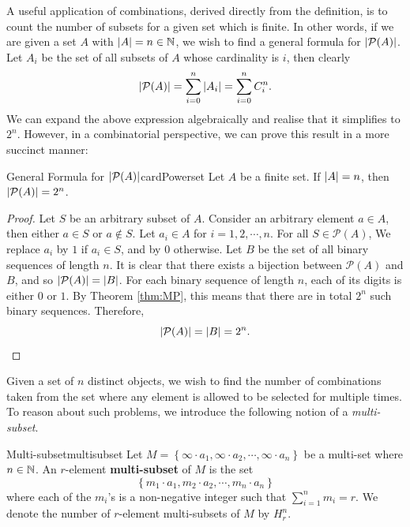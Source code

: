 \documentclass[math]{amznotes}
\theoremstyle{remark}
\begin{document}
A useful application of combinations, derived directly from the definition, is to count the number of subsets for a given set which is finite. In other words, if we are given a set $A$ with ${\left\lvert {A} \right\rvert} = n \in \mathbb{N}$, we wish to find a general formula for ${\left\lvert {\mathcal{P}(A)} \right\rvert}$. Let $A_i$ be the set of all subsets of $A$ whose cardinality is $i$, then clearly
\begin{equation*}
    {\left\lvert {\mathcal{P}(A)} \right\rvert} = \sum_{i = 0}^{n}{\left\lvert {A_i} \right\rvert} = \sum_{i = 0}^{n}C^n_i.
\end{equation*}
We can expand the above expression algebraically and realise that it simplifies to $2^n$. However, in a combinatorial perspective, we can prove this result in a more succinct manner:
\begin{thmbox}{General Formula for ${\left\lvert {\mathcal{P}(A)} \right\rvert}$}{cardPowerset}
    Let $A$ be a finite set. If ${\left\lvert {A} \right\rvert} = n$, then ${\left\lvert {\mathcal{P}(A)} \right\rvert} = 2^n$.
    \tcblower
    \begin{proof}
        Let $S$ be an arbitrary subset of $A$. Consider an arbitrary element $a \in A$, then either $a \in S$ or $a \notin S$. Let $a_i \in A$ for $i = 1, 2, \cdots, n$. For all $S \in \mathcal{P}(A)$, We replace $a_i$ by $1$ if $a_i \in S$, and by $0$ otherwise. Let $B$ be the set of all binary sequences of length $n$. It is clear that there exists a bijection between $\mathcal{P}(A)$ and $B$, and so ${\left\lvert {\mathcal{P}(A)} \right\rvert} = {\left\lvert {B} \right\rvert}$. For each binary sequence of length $n$, each of its digits is either $0$ or $1$. By Theorem \ref{thm:MP}, this means that there are in total $2^n$ such binary sequences. Therefore,
        \begin{equation*}
            {\left\lvert {\mathcal{P}(A)} \right\rvert} = {\left\lvert {B} \right\rvert} = 2^n.
        \end{equation*}
    \end{proof}
\end{thmbox}
Given a set of $n$ distinct objects, we wish to find the number of combinations taken from the set where any element is allowed to be selected for multiple times. To reason about such problems, we introduce the following notion of a \textit{multi-subset}.
\begin{dfnbox}{Multi-subset}{multisubset}
    Let $M = \left\{\infty \cdot a_1, \infty \cdot a_2, \cdots, \infty \cdot a_n\right\}$ be a multi-set where $n \in \mathbb{N}$. An $r$-element {\color{red} \textbf{multi-subset}} of $M$ is the set
    \begin{displaymath}
        \left\{m_1 \cdot a_1, m_2 \cdot a_2, \cdots, m_n \cdot a_n\right\}
    \end{displaymath}
    where each of the $m_i$'s is a non-negative integer such that $\sum_{i = 1}^{n}m_i = r$. We denote the number of $r$-element multi-subsets of $M$ by $H^n_r$.
\end{dfnbox}
\end{document}
